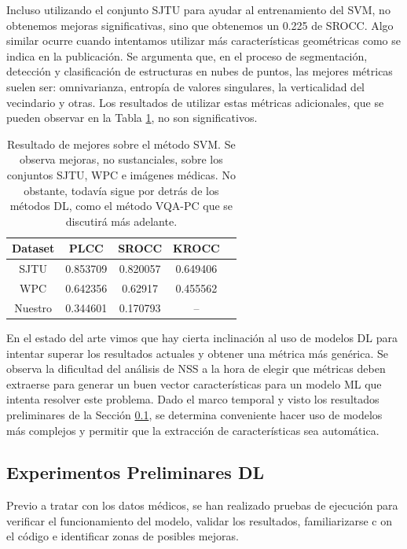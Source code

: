 Incluso utilizando el conjunto SJTU\cite{SJTU} para ayudar al entrenamiento 
del SVM, no obtenemos mejoras significativas, sino que obtenemos un 0.225 de SROCC.
Algo similar ocurre cuando intentamos utilizar más características geométricas
como se indica en la publicación\cite{3DNSSMetrics}. Se argumenta que, en el proceso de segmentación, 
detección y clasificación de estructuras en nubes de puntos, 
las mejores métricas suelen ser: 
omnivarianza, entropía de valores singulares, la verticalidad del vecindario y 
otras. Los resultados de utilizar estas métricas adicionales, que 
se pueden observar en la Tabla \ref{tab:ImprovNR3DQA}, no son significativos.

\begin{table}[htp]
  \begin{center}
    \begin{tabular}[c]{|c|c|c|c|c|}
      \hline
      \rowcolor[HTML]{FFC702}
      \textbf{Dataset} & \textbf{PLCC} & \textbf{SROCC} & \textbf{KROCC} \\ 
      \hline
      SJTU & 0.853709 & 0.820057 & 0.649406 \\ 
      \hline 
      WPC & 0.642356 & 0.62917 & 0.455562 \\
      \hline 
      Nuestro & 0.344601 &  0.170793 & -- \\
      \hline
    \end{tabular}
  \end{center}
  \caption[Resultado de mejores sobre el método SVM]{Resultado de mejores sobre el método SVM.
   Se observa mejoras, no sustanciales, sobre los conjuntos SJTU\cite{SJTU}, WPC\cite{WPC1, WPC2} e imágenes médicas.
   No obstante, todavía sigue por detrás de los métodos DL, como el método VQA-PC 
   que se discutirá más adelante.
  }
  \label{tab:ImprovNR3DQA}
\end{table}

En el estado del arte vimos que hay cierta inclinación al uso de modelos 
DL para intentar superar los resultados actuales y obtener una métrica más 
genérica. Se observa la dificultad del análisis de NSS a la hora de elegir que métricas 
deben extraerse para generar un buen vector características para un modelo ML 
que intenta resolver este problema. Dado el marco temporal y visto los 
resultados preliminares de la Sección \ref{sec:PreResults}, se determina 
conveniente hacer uso de modelos más complejos y permitir que la extracción 
de características sea automática. 

\subsection{Experimentos Preliminares DL}
\label{sec:PreResults}
Previo a tratar con los datos médicos, se han realizado pruebas de ejecución 
para verificar el funcionamiento del modelo, validar los resultados, familiarizarse c
on el código e identificar zonas de posibles mejoras.

